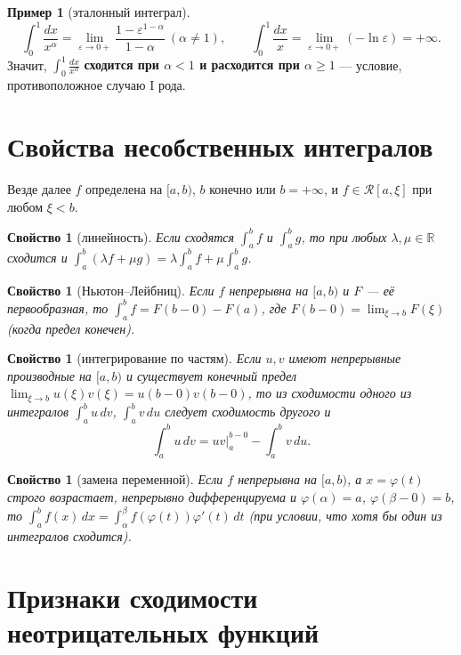 \documentclass[11pt,a4paper]{article}
\theoremstyle{definition}
\newtheorem{example}[definition]{Пример}
\theoremstyle{plain}
\newtheorem{property}[definition]{Свойство}
\newcommand{\R}{\mathbb{R}}
\newcommand{\dx}{\,dx}
\newcommand{\dt}{\,dt}
\newcommand{\eps}{\varepsilon}
\renewcommand{\ge}{\geqslant}
\begin{document}
\begin{example}[эталонный интеграл]
\[
  \int_0^{1}\frac{dx}{x^\alpha}=\lim_{\eps\to0+}\frac{1-\eps^{1-\alpha}}{1-\alpha}\ (\alpha\ne1),
  \qquad \int_0^{1}\frac{dx}{x}=\lim_{\eps\to0+}(-\ln\eps)=+\infty .
\]
Значит, $\displaystyle\int_0^{1}\frac{dx}{x^\alpha}$ \textbf{сходится при $\alpha<1$ и расходится
при $\alpha\ge1$} — условие, противоположное случаю I рода.
\end{example}

\section{Свойства несобственных интегралов}

Везде далее $f$ определена на $[a,b)$, $b$ конечно или $b=+\infty$, и $f\in\mathcal R[a,\xi]$ при
любом $\xi<b$.

\begin{property}[линейность]
Если сходятся $\int_a^b f$ и $\int_a^b g$, то при любых $\lambda,\mu\in\R$ сходится и
$\displaystyle\int_a^b(\lambda f+\mu g)=\lambda\!\int_a^b f+\mu\!\int_a^b g$.
\end{property}

\begin{property}[Ньютон–Лейбниц]
Если $f$ непрерывна на $[a,b)$ и $F$ — её первообразная, то
$\displaystyle\int_a^b f=F(b-0)-F(a)$, где $F(b-0)=\lim_{\xi\to b}F(\xi)$ (когда предел конечен).
\end{property}

\begin{property}[интегрирование по частям]
Если $u,v$ имеют непрерывные производные на $[a,b)$ и существует конечный предел
$\lim_{\xi\to b}u(\xi)v(\xi)=u(b-0)v(b-0)$, то из сходимости одного из интегралов
$\int_a^b u\,dv$, $\int_a^b v\,du$ следует сходимость другого и
\[
  \int_a^b u\,dv=uv\Big|_a^{b-0}-\int_a^b v\,du .
\]
\end{property}

\begin{property}[замена переменной]
Если $f$ непрерывна на $[a,b)$, а $x=\varphi(t)$ строго возрастает, непрерывно дифференцируема и
$\varphi(\alpha)=a$, $\varphi(\beta-0)=b$, то
$\displaystyle\int_a^b f(x)\dx=\int_\alpha^\beta f(\varphi(t))\varphi'(t)\dt$ (при условии, что
хотя бы один из интегралов сходится).
\end{property}

\section{Признаки сходимости неотрицательных функций}
\end{document}

